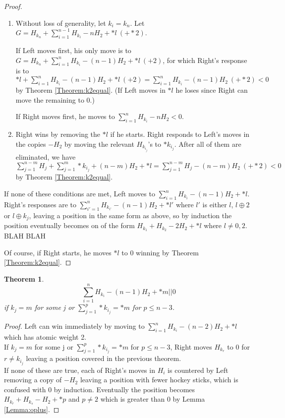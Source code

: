 \documentclass{amsart}
\newcommand{\ds}{\displaystyle}
\newtheorem{theorem}[definition]{Theorem}
\begin{document}
\begin{proof}
\begin{enumerate}
\item Without loss of generality, let $k_i=k_n$.  Let $\ds G=H_{k_n} +\sum_{i=1}^{n-1} H_{k_i} -nH_2 + *l\ (+*2)$.  \\
\par If Left moves first, his only move is to $\ds G=H_{k_n} +\sum_{i=1}^n H_{k_i} -(n-1)H_2 + *l\ (+2)$, for which Right's response is to $\ds *l+\sum_{i=1}^n H_{k_i} -(n-1)H_2 + *l\ (+2)=\sum_{i=1}^n H_{k_i} -(n-1)H_2\ (+*2)<0$ by Theorem \ref{Theorem:k2equal}. (If Left moves in $*l$ he loses since Right can move the remaining to 0.)\\
\par If Right moves first, he moves to $\ds \sum_{i=1}^{n} H_{k_i} -nH_2<0$.

\item
Right wins by removing the $*l$ if he starts.  Right responds to Left's moves in the copies $-H_2$ by moving the relevant $H_{k_{i_j}}$'s to $*k_{i_j}$.  After all of them are eliminated, we have $\ds \sum_{j=1}^{n-m} H_j +\sum_{j=1}^m *k_{i_j} +(n-m) H_2 + *l=\sum_{j=1}^{n-m} H_j-(n-m)H_2\ (+*2)<0$  by Theorem \ref{Theorem:k2equal}.\\


\end{enumerate}
If none of these conditions are met, Left moves to $\ds \sum_{i=1}^n H_{k_i} -(n-1)H_2+*l$.  Right's responses are to $\ds \sum_{i'=1}^n H_{k_{i'}} -(n-1)H_2+*l'$ where $l'$ is either $l$, $l\oplus 2$ or $l\oplus k_j$, leaving a position in the same form as above, so by induction the position eventually becomes on of the form $H_{k_1}+H_{k_2}-2H_2+*l$ where $l\neq 0,2$.  BLAH BLAH
\par Of course, if Right starts, he moves $*l$ to 0 winning by Theorem \ref{Theorem:k2equal}.


\end{proof}




\begin{theorem}
$$\sum_{i=1}^n H_{k_i} -(n-1)H_2+*m||0$$
if $k_j=m$ for some j or $\sum_{j=1}^p *k_{i_j}=*m$ for $p\leq n-3$.
\end{theorem}
\begin{proof}
Left can win immediately by moving to $\ds \sum_{i=1}^n H_{k_i} -(n-2)H_2 +*l$ which has atomic weight 2.\\
If $k_j=m$ for some j or $\sum_{j=1}^p *k_{i_j}=*m$ for $p\leq n-3$, Right moves $H_{k_r}$ to 0 for $r\neq k_{i_j}$ leaving a position covered in the previous theorem.\\
If none of these are true, each of Right's moves in $H_i$ is countered by Left removing a copy of $-H_2$ leaving a position with fewer hockey sticks, which is confused with 0 by induction.  Eventually the position becomes $H_{k_r}+H_{k_s}-H_2+*p$ and $p\neq 2$ which is greater than 0 by Lemma \ref{Lemma:oplus}.
\end{proof}
\end{document}
